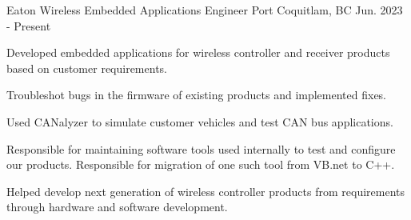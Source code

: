 


\begin{cventries}
    \cventry
    {Eaton Wireless} %
    {Embedded Applications Engineer} %
    {Port Coquitlam, BC} %
    {Jun. 2023 - Present} %
    { %
        \begin{cvitems}
            \item {Developed embedded applications for wireless controller and receiver products based on customer requirements.}
            \item {Troubleshot bugs in the firmware of existing products and implemented fixes.}
            \item {Used CANalyzer to simulate customer vehicles and test CAN bus applications. }
            \item {Responsible for maintaining software tools used internally to test and configure our products. Responsible for migration of one such tool from VB.net to C++.}
            \item {Helped develop next generation of wireless controller products from requirements through hardware and software development.}
        \end{cvitems}
    }


\end{cventries}
